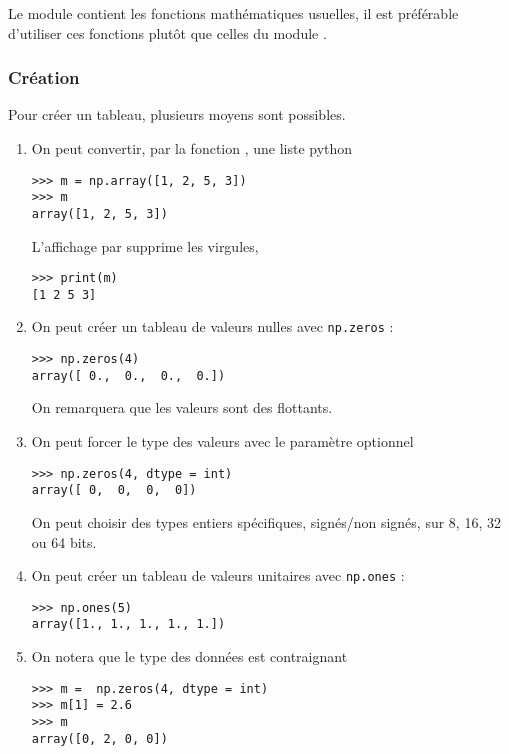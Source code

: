 Le module contient les fonctions mathématiques usuelles, il est préférable d'utiliser ces fonctions plutôt que celles du module .
\subsubsection{Création}
Pour créer un tableau, plusieurs moyens sont possibles.

\begin{enumerate}
\item On peut convertir, par la fonction , une liste python

\begin{lstlisting}
>>> m = np.array([1, 2, 5, 3])
>>> m
array([1, 2, 5, 3])
\end{lstlisting}

L'affichage par  supprime les virgules,
\begin{lstlisting}
>>> print(m)
[1 2 5 3]
\end{lstlisting}
\newpage
\item On peut créer un tableau de valeurs nulles avec {\tt np.zeros} :
\begin{lstlisting}
>>> np.zeros(4)
array([ 0.,  0.,  0.,  0.])
\end{lstlisting}
On remarquera que les valeurs sont des flottants.

\item On peut forcer le type des valeurs avec le paramètre optionnel 
\begin{lstlisting}
>>> np.zeros(4, dtype = int)
array([ 0,  0,  0,  0])
\end{lstlisting}
On peut choisir des types entiers spécifiques, signés/non signés, sur 8, 16, 32 ou 64 bits.

\item On peut créer un tableau de valeurs unitaires avec {\tt np.ones} :
\begin{lstlisting}
>>> np.ones(5)
array([1., 1., 1., 1., 1.])
\end{lstlisting}

\item On notera que le type des données est contraignant
\begin{lstlisting}
>>> m =  np.zeros(4, dtype = int)
>>> m[1] = 2.6
>>> m
array([0, 2, 0, 0])
\end{lstlisting}


\end{enumerate}
